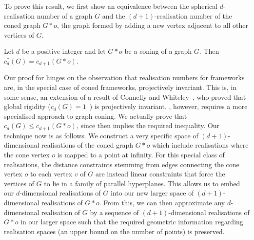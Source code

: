 \documentclass[ALCO]{cedram}
\begin{document}
To prove this result, we first show an equivalence between the spherical $d$-realisation number of a graph $G$ and the $(d+1)$-realisation number of the coned graph $G*o$, the graph formed by adding a new vertex adjacent to all other vertices of $G$.


\begin{theorem}\label{t:conecount}
	Let $d$ be a positive integer and let $G*o$ be a coning of a graph $G$.
	Then $c^*_{d}(G) = c_{d+1}(G*o)$.
\end{theorem}

Our proof for  hinges on the observation that realisation numbers for frameworks are, in the special case of coned frameworks, projectively invariant.
This is, in some sense, an extension of a result of Connelly and Whiteley~\cite{cw10}, who proved that global rigidity (\ie $c_d(G)=1$~\cite{Gortler2014}) is projectively invariant.
, however, requires a more specialised approach to graph coning.
We actually prove that $c_{d}(G) \leq c_{d+1}(G*o)$,
since  then implies the required inequality.
Our technique now is as follows.
We construct a very specific space of $(d+1)$-dimensional realisations of the coned graph $G*o$ which include realisations where the cone vertex $o$ is mapped to a point at infinity.
For this special class of realisations, the distance constraints stemming from edges connecting the cone vertex $o$ to each vertex $v$ of $G$ are instead linear constraints that force the vertices of $G$ to lie in a family of parallel hyperplanes.
This allows us to embed our $d$-dimensional realisations of $G$ into our new larger space of $(d+1)$-dimensional realisations of $G*o$.
From this, we can then approximate any $d$-dimensional realisation of $G$ by a sequence of $(d+1)$-dimensional realisations of $G*o$ in our larger space such that the required geometric information regarding realisation spaces (\ie an upper bound on the number of points) is preserved.
\end{document}
